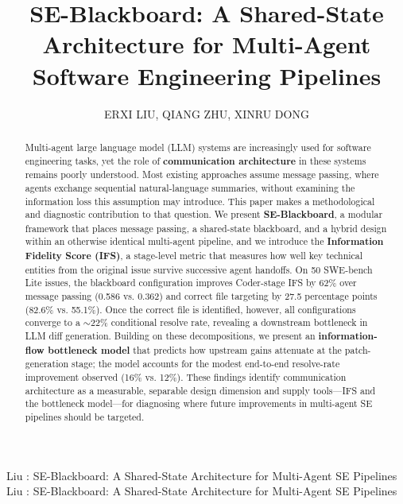 \documentclass{ieeeaccess}
\begin{document}
\doi{} %

\title{SE-Blackboard: A Shared-State Architecture for Multi-Agent Software Engineering Pipelines}
\author{\uppercase{Erxi Liu},
\uppercase{Qiang Zhu},
\uppercase{Xinru Dong}}

\address[1]{Tandon School of Engineering, New York University, New York, United States (e-mail: el4435@nyu.edu)}
\address[2]{The National Institute of Metrology of China, Beijing, China (e-mail: zhuqiang@nim.ac.cn)}
\address[3]{School of Mechanical and Electrical Engineering, Beijing Institute of Graphic Communication, Beijing, China (e-mail: 18339301370@163.com)}

\markboth
{Liu \headeretal: SE-Blackboard: A Shared-State Architecture for Multi-Agent SE Pipelines}
{Liu \headeretal: SE-Blackboard: A Shared-State Architecture for Multi-Agent SE Pipelines}


\begin{abstract}
Multi-agent large language model (LLM) systems are increasingly used for software engineering tasks, yet the role of \textbf{communication architecture} in these systems remains poorly understood. Most existing approaches assume message passing, where agents exchange sequential natural-language summaries, without examining the information loss this assumption may introduce. This paper makes a methodological and diagnostic contribution to that question. We present \textbf{SE-Blackboard}, a modular framework that places message passing, a shared-state blackboard, and a hybrid design within an otherwise identical multi-agent pipeline, and we introduce the \textbf{Information Fidelity Score (IFS)}, a stage-level metric that measures how well key technical entities from the original issue survive successive agent handoffs. On 50 SWE-bench Lite issues, the blackboard configuration improves Coder-stage IFS by 62\% over message passing (0.586 vs. 0.362) and correct file targeting by 27.5 percentage points (82.6\% vs. 55.1\%). Once the correct file is identified, however, all configurations converge to a $\sim$22\% conditional resolve rate, revealing a downstream bottleneck in LLM diff generation. Building on these decompositions, we present an \textbf{information-flow bottleneck model} that predicts how upstream gains attenuate at the patch-generation stage; the model accounts for the modest end-to-end resolve-rate improvement observed (16\% vs. 12\%). These findings identify communication architecture as a measurable, separable design dimension and supply tools---IFS and the bottleneck model---for diagnosing where future improvements in multi-agent SE pipelines should be targeted.
\end{abstract}
\end{document}
